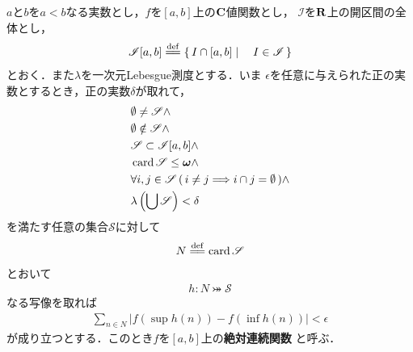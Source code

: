 	\begin{screen}
		\begin{dfn}[絶対連続関数]
			$a$と$b$を$a < b$なる実数とし，$f$を$[a,b]$上の$\mathbf{C}$値関数とし，
			$\mathscr{I}$を$\mathbf{R}$上の開区間の全体とし，
			\begin{align}
				\mathscr{I}[a,b] \defeq \Set{I \cap [a,b]}{I \in \mathscr{I}}
			\end{align}
			とおく．また$\lambda$を一次元Lebesgue測度とする．いま
			$\epsilon$を任意に与えられた正の実数とするとき，正の実数$\delta$が取れて，
			\begin{align}
				&\emptyset \neq \mathscr{S} \wedge \\
				&\emptyset \notin \mathscr{S} \wedge \\
				&\mathscr{S} \subset \mathscr{I}[a,b] \wedge \\
				&\operatorname{card} \mathscr{S} \leq {\boldsymbol \omega} \wedge \\
				&\forall i,j \in \mathscr{S}\, (\, i \neq j \Longrightarrow i \cap j = \emptyset\, ) \wedge \\
				&\lambda\left(\bigcup \mathscr{S}\right) < \delta
			\end{align}
			を満たす任意の集合$\mathscr{S}$に対して
			\begin{align}
				N \defeq \card{\mathscr{S}}
			\end{align}
			とおいて
			\begin{align}
				h:N \bij \mathscr{S}
			\end{align}
			なる写像を取れば
			\begin{align}
				\sum_{n \in N} |f(\sup{}{h(n)}) - f(\inf{}{h(n)})| < \epsilon
			\end{align}
			が成り立つとする．このとき$f$を$[a,b]$上の{\bf 絶対連続関数}
			と呼ぶ．
		\end{dfn}
	\end{screen}
	
	\begin{screen}
		\begin{thm}[$AC$は線型空間である]
		\end{thm}
	\end{screen}
	
	\begin{screen}
		\begin{thm}[絶対連続関数は有界変動である]
		\end{thm}
	\end{screen}
	
